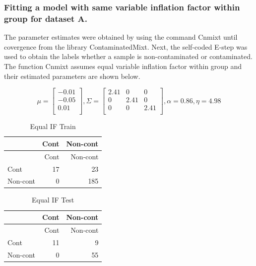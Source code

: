 \documentclass[
]{article}
\begin{document}
\hypertarget{fitting-a-model-with-same-variable-inflation-factor-within-group-for-dataset-a.}{%
\subsubsection{Fitting a model with same variable inflation factor
within group for dataset
A.}\label{fitting-a-model-with-same-variable-inflation-factor-within-group-for-dataset-a.}}

The parameter estimates were obtained by using the command Cnmixt until
covergence from the library ContaminatedMixt. Next, the self-coded
E-step was used to obtain the labels whether a sample is
non-contaminated or contaminated. The function Cnmixt assumes equal
variable inflation factor within group and their estimated parameters
are shown below.

\[
\mu = \begin{bmatrix}-0.01 \\-0.05 \\0.01 \\\end{bmatrix} , \Sigma = \begin{bmatrix}2.41&0&0 \\0&2.41&0 \\0&0&2.41 \\\end{bmatrix}, \alpha = 0.86 , \eta = 4.98
\]

\begin{longtable}[]{@{}lrr@{}}
\caption{Equal IF Train}\tabularnewline
\toprule\noalign{}
& Cont & Non-cont \\
\midrule\noalign{}
\endfirsthead
\toprule\noalign{}
& Cont & Non-cont \\
\midrule\noalign{}
\endhead
\bottomrule\noalign{}
\endlastfoot
Cont & 17 & 23 \\
Non-cont & 0 & 185 \\
\end{longtable}

\begin{longtable}[]{@{}lrr@{}}
\caption{Equal IF Test}\tabularnewline
\toprule\noalign{}
& Cont & Non-cont \\
\midrule\noalign{}
\endfirsthead
\toprule\noalign{}
& Cont & Non-cont \\
\midrule\noalign{}
\endhead
\bottomrule\noalign{}
\endlastfoot
Cont & 11 & 9 \\
Non-cont & 0 & 55 \\
\end{longtable}
\end{document}
